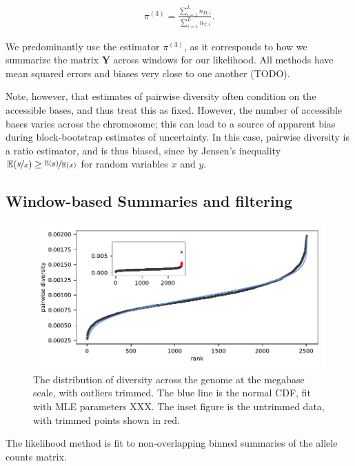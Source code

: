 \documentclass[11pt]{article}
\newcommand{\E}{\mathbb{E}}
\begin{document}
\begin{align}
  \label{eq:}
  \pi^{(3)} = \frac{\sum_{i=1}^L n_{D,i}}{\sum_{i=1}^L n_{T,i}}.
\end{align}

We predominantly use the estimator $\pi^{(3)}$, as it corresponds to how we
summarize the matrix $\mathbf{Y}$ across windows for our likelihood. All
methods have mean squared errors and biases very close to one another (TODO).

Note, however, that estimates of pairwise diversity often condition on the
accessible bases, and thus treat this as fixed. However, the number of
accessible bases varies across the chromosome; this can lead to a source of
apparent bias during block-bootstrap estimates of uncertainty.  In this case,
pairwise diversity is a ratio estimator, and is thus biased, since by Jensen's
inequality $\E(\nicefrac{y}{x}) \ge \nicefrac{\E(y)}{\E(x)}$ for random
variables $x$ and $y$. 

\subsection{Window-based Summaries and filtering}

\begin{figure}[!htb]
  \centering
  \includegraphics{figures/supplementary/diversity_trimming_dist.pdf}

  \caption{The distribution of diversity across the genome at the megabase
  scale, with outliers trimmed. The blue line is the normal CDF, fit with MLE
parameters XXX. The inset figure is the untrimmed data, with trimmed points
shown in red.}

  \label{suppfig:trimming}
\end{figure}


The likelihood method is fit to non-overlapping binned summaries of the allele
counts matrix. 
\end{document}
